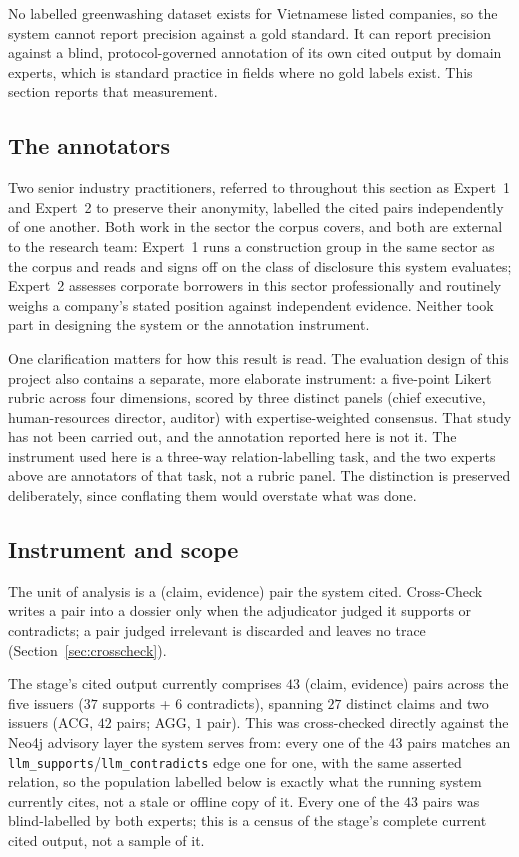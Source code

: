 \documentclass[fontsize=12pt,oneside,headings=small]{scrreprt}
\begin{document}
No labelled greenwashing dataset exists for Vietnamese listed companies, so the system cannot report precision against a gold standard. It can report precision against a blind, protocol-governed annotation of its own cited output by domain experts, which is standard practice in fields where no gold labels exist. This section reports that measurement.

\subsection{The annotators}

Two senior industry practitioners, referred to throughout this section as Expert~1 and Expert~2 to preserve their anonymity, labelled the cited pairs independently of one another. Both work in the sector the corpus covers, and both are external to the research team: Expert~1 runs a construction group in the same sector as the corpus and reads and signs off on the class of disclosure this system evaluates; Expert~2 assesses corporate borrowers in this sector professionally and routinely weighs a company's stated position against independent evidence. Neither took part in designing the system or the annotation instrument.

One clarification matters for how this result is read. The evaluation design of this project also contains a separate, more elaborate instrument: a five-point Likert rubric across four dimensions, scored by three distinct panels (chief executive, human-resources director, auditor) with expertise-weighted consensus. That study has not been carried out, and the annotation reported here is not it. The instrument used here is a three-way relation-labelling task, and the two experts above are annotators of that task, not a rubric panel. The distinction is preserved deliberately, since conflating them would overstate what was done.


\subsection{Instrument and scope}

The unit of analysis is a (claim, evidence) pair the system cited. Cross-Check writes a pair into a dossier only when the adjudicator judged it \textsf{supports} or \textsf{contradicts}; a pair judged \textsf{irrelevant} is discarded and leaves no trace (Section~\ref{sec:crosscheck}).

The stage's cited output currently comprises $43$ (claim, evidence) pairs across the five issuers ($37$ \textsf{supports} + $6$ \textsf{contradicts}), spanning $27$ distinct claims and two issuers (ACG, $42$ pairs; AGG, $1$ pair). This was cross-checked directly against the Neo4j advisory layer the system serves from: every one of the $43$ pairs matches an \texttt{llm\_supports}/\texttt{llm\_contradicts} edge one for one, with the same asserted relation, so the population labelled below is exactly what the running system currently cites, not a stale or offline copy of it. Every one of the $43$ pairs was blind-labelled by both experts; this is a census of the stage's complete current cited output, not a sample of it.
\end{document}
